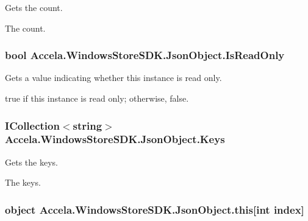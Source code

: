 Gets the count. 

The count.\hypertarget{class_accela_1_1_windows_store_s_d_k_1_1_json_object_af3891976cd147b89daa26afd105ad175}{
\subsubsection[{Is\+Read\+Only}]{\setlength{\rightskip}{0pt plus 5cm}bool Accela.\+Windows\+Store\+S\+D\+K.\+Json\+Object.\+Is\+Read\+Only\hspace{0.3cm}{\ttfamily [get]}}}\label{class_accela_1_1_windows_store_s_d_k_1_1_json_object_af3891976cd147b89daa26afd105ad175}


Gets a value indicating whether this instance is read only. 

{\ttfamily true} if this instance is read only; otherwise, {\ttfamily false}. \hypertarget{class_accela_1_1_windows_store_s_d_k_1_1_json_object_a9f610abba3e39b109b148884ea848fa1}{
\subsubsection[{Keys}]{\setlength{\rightskip}{0pt plus 5cm}I\+Collection$<$string$>$ Accela.\+Windows\+Store\+S\+D\+K.\+Json\+Object.\+Keys\hspace{0.3cm}{\ttfamily [get]}}}\label{class_accela_1_1_windows_store_s_d_k_1_1_json_object_a9f610abba3e39b109b148884ea848fa1}


Gets the keys. 

The keys.\hypertarget{class_accela_1_1_windows_store_s_d_k_1_1_json_object_ad0d0d8c5f7fe70b0b92cc81b2478c864}{
\subsubsection[{this[int index]}]{\setlength{\rightskip}{0pt plus 5cm}object Accela.\+Windows\+Store\+S\+D\+K.\+Json\+Object.\+this\mbox{[}int index\mbox{]}\hspace{0.3cm}{\ttfamily [get]}}}\label{class_accela_1_1_windows_store_s_d_k_1_1_json_object_ad0d0d8c5f7fe70b0b92cc81b2478c864}


